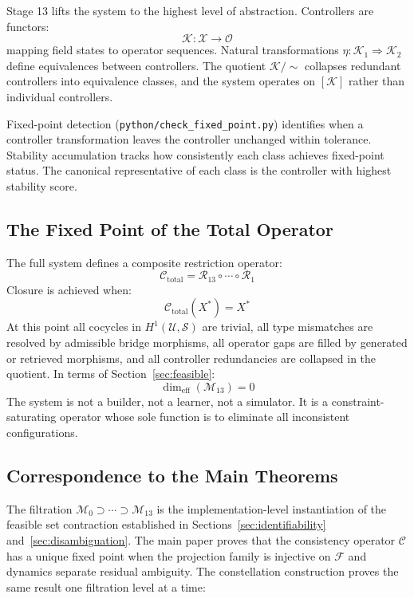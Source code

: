 \documentclass[11pt, oneside]{article}
\begin{document}
Stage 13 lifts the system to the highest level of abstraction. Controllers are functors:
\[
\mathcal{K} : \mathcal{X} \to \mathcal{O}
\]
mapping field states to operator sequences. Natural transformations $\eta : \mathcal{K}_1
\Rightarrow \mathcal{K}_2$ define equivalences between controllers. The quotient
$\mathcal{K}/{\sim}$ collapses redundant controllers into equivalence classes, and the
system operates on $[\mathcal{K}]$ rather than individual controllers.

Fixed-point detection (\texttt{python/check\_fixed\_point.py}) identifies when a
controller transformation leaves the controller unchanged within tolerance. Stability
accumulation tracks how consistently each class achieves fixed-point status. The
canonical representative of each class is the controller with highest stability score.

\subsection{The Fixed Point of the Total Operator}

The full system defines a composite restriction operator:
\[
\mathcal{C}_{\mathrm{total}} = \mathcal{R}_{13} \circ \cdots \circ \mathcal{R}_1
\]
Closure is achieved when:
\[
\mathcal{C}_{\mathrm{total}}(X^*) = X^*
\]
At this point all cocycles in $H^1(\mathcal{U}, \mathcal{S})$ are trivial, all type
mismatches are resolved by admissible bridge morphisms, all operator gaps are filled by
generated or retrieved morphisms, and all controller redundancies are collapsed in the
quotient. In terms of Section~\ref{sec:feasible}:
\[
\dim_{\mathrm{eff}}(\mathcal{M}_{13}) = 0
\]
The system is not a builder, not a learner, not a simulator. It is a
constraint-saturating operator whose sole function is to eliminate all inconsistent
configurations.

\subsection{Correspondence to the Main Theorems}

The filtration $\mathcal{M}_0 \supset \cdots \supset \mathcal{M}_{13}$ is the
implementation-level instantiation of the feasible set contraction established in
Sections~\ref{sec:identifiability} and~\ref{sec:disambiguation}. The main paper proves
that the consistency operator $\mathcal{C}$ has a unique fixed point when the projection
family is injective on $\mathcal{F}$ and dynamics separate residual ambiguity. The
constellation construction proves the same result one filtration level at a time:
\end{document}
